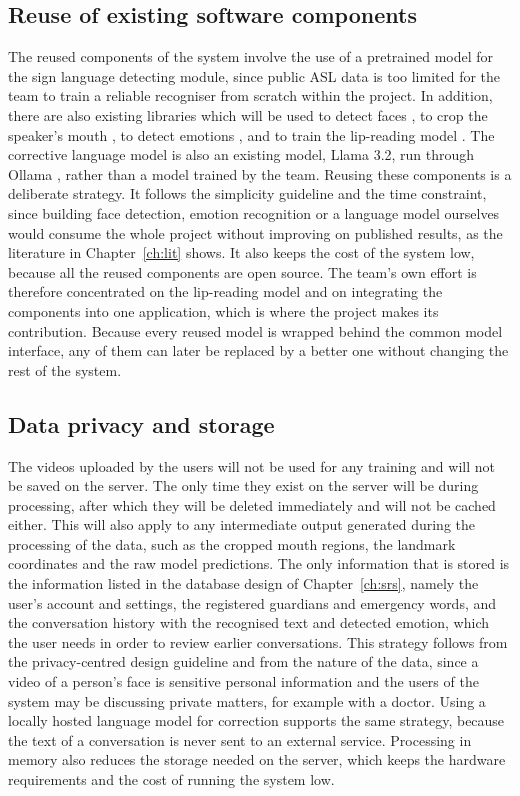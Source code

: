 \documentclass{FastFyp}
\begin{document}
\subsection{Reuse of existing software components}
The reused components of the system involve the use of a pretrained model for the sign language detecting module, since public ASL data is too limited for the team to train a reliable recogniser from scratch within the project. In addition, there are also existing libraries which will be used to detect faces \cite{lugaresi2019mediapipe}, to crop the speaker's mouth \cite{googlemediapipe2026}, to detect emotions \cite{savchenko2022hsemotion}, and to train the lip-reading model \cite{tensorflow2015,paszke2019pytorch}. The corrective language model is also an existing model, Llama 3.2, run through Ollama \cite{ollama_llama32_3b}, rather than a model trained by the team. Reusing these components is a deliberate strategy. It follows the simplicity guideline and the time constraint, since building face detection, emotion recognition or a language model ourselves would consume the whole project without improving on published results, as the literature in Chapter~\ref{ch:lit} shows. It also keeps the cost of the system low, because all the reused components are open source. The team's own effort is therefore concentrated on the lip-reading model and on integrating the components into one application, which is where the project makes its contribution. Because every reused model is wrapped behind the common model interface, any of them can later be replaced by a better one without changing the rest of the system.

\subsection{Data privacy and storage}
The videos uploaded by the users will not be used for any training and will not be saved on the server. The only time they exist on the server will be during processing, after which they will be deleted immediately and will not be cached either. This will also apply to any intermediate output generated during the processing of the data, such as the cropped mouth regions, the landmark coordinates and the raw model predictions. The only information that is stored is the information listed in the database design of Chapter~\ref{ch:srs}, namely the user's account and settings, the registered guardians and emergency words, and the conversation history with the recognised text and detected emotion, which the user needs in order to review earlier conversations. This strategy follows from the privacy-centred design guideline and from the nature of the data, since a video of a person's face is sensitive personal information and the users of the system may be discussing private matters, for example with a doctor. Using a locally hosted language model for correction supports the same strategy, because the text of a conversation is never sent to an external service. Processing in memory also reduces the storage needed on the server, which keeps the hardware requirements and the cost of running the system low.
\end{document}
